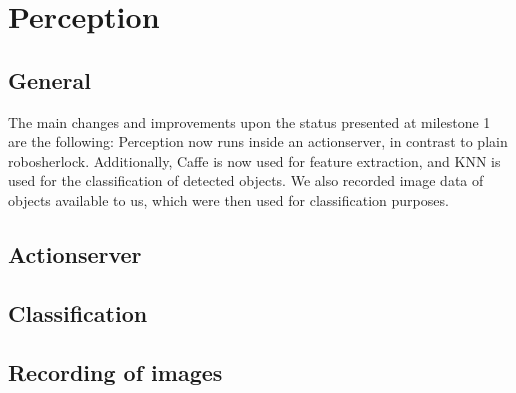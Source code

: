 \documentclass[main.tex]{subfiles}
\begin{document}
	
	\chapter{Perception}
		
		\section{General}
		The main changes and improvements upon the status presented at milestone 1 are the following: Perception now runs inside an actionserver, in contrast to 				plain robosherlock. Additionally, Caffe is now used for feature extraction, and KNN is used for the classification of detected objects. We also recorded 				image data of objects available to us, which were then used for classification purposes.
		
		\section{Actionserver}
		
		\section{Classification}
		
		\section{Recording of images}  
\end{document}
